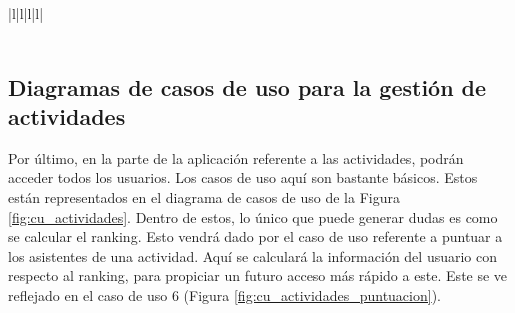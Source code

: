\begin{table}[hp!]
{\begin{tabular}{|l|l|l|l|}
        \hline
                                                                                                                                                                                                                                \\ 
        \hline
                                                                                                                                                \\
        \hline
        \end{tabular}
    }
    \caption{Curso de eventos del caso de uso 5}
\end{table}

\newpage

\subsection{Diagramas de casos de uso para la gestión de actividades}

Por último, en la parte de la aplicación referente a las actividades, podrán acceder todos los usuarios. Los casos de uso aquí son bastante básicos. Estos están representados en el diagrama de casos de uso de la Figura \ref{fig:cu_actividades}. Dentro de estos, lo único que puede generar dudas es como se calcular el ranking. Esto vendrá dado por el caso de uso referente a puntuar a los asistentes de una actividad. Aquí se calculará la información del usuario con respecto al ranking, para propiciar un futuro acceso más rápido a este. Este se ve reflejado en el caso de uso 6 (Figura \ref{fig:cu_actividades_puntuacion}).

